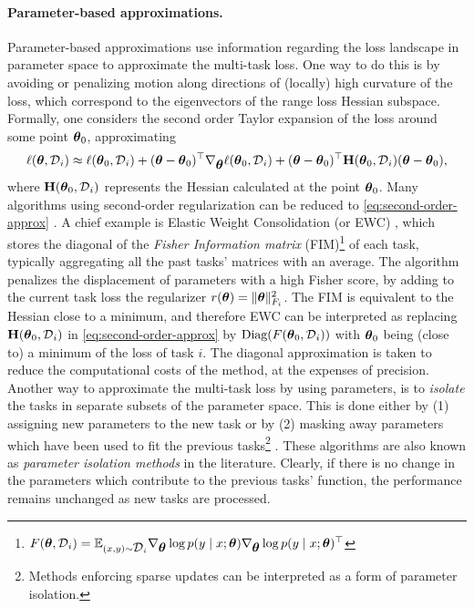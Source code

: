 \documentclass{article} %
\newcommand{\hessian}{\vH}
\begin{document}
\paragraph{Parameter-based approximations.}
Parameter-based approximations use information regarding the loss landscape in parameter space to approximate the multi-task loss. One way to do this is by avoiding or penalizing motion along directions of (locally) high curvature of the loss, which correspond to the eigenvectors of the range loss Hessian subspace. Formally, one considers the second order Taylor expansion of the loss around some point $\mbox{$\mbox{$\boldsymbol{\theta}$}$}_0$, approximating 
\begin{equation}
\label{eq:second-order-approx}
    \loss(\vparam, \data_i) \approx \loss(\vparam_0, \data_i) + (\vparam - \vparam_0)^\top\grad_{\vparam}\loss(\vparam_0, \data_i) + (\vparam - \vparam_0)^\top\hessian(\vparam_0, \data_i)(\vparam - \vparam_0),
\end{equation}
where $\hessian(\vparam_0, \data_i)$ represents the Hessian calculated at the point $\mbox{$\mbox{$\boldsymbol{\theta}$}$}_0$. Many algorithms using second-order regularization can be reduced to \cref{eq:second-order-approx} \citep{yin_optimization_2020}. A chief example is  Elastic Weight Consolidation (or EWC) \citep{kirkpatrick_overcoming_2017}, which stores the diagonal of the \emph{Fisher Information matrix} (FIM)\footnote{$F(\mbox{$\mbox{$\boldsymbol{\theta}$}$}, \mbox{${\cal D}$}_i) = \mathbb{E}_{(x, y) \sim \mbox{${\cal D}$}_i} \nabla_{\mbox{$\mbox{$\boldsymbol{\theta}$}$}} \log p(y \mid x; \mbox{$\mbox{$\boldsymbol{\theta}$}$}) 
\nabla_{\mbox{$\mbox{$\boldsymbol{\theta}$}$}} \log p(y \mid x; \mbox{$\mbox{$\boldsymbol{\theta}$}$})^\top 
$} of each task, typically aggregating all the past tasks' matrices with an average. The algorithm penalizes the displacement of parameters with a high Fisher score, by adding to the current task loss the regularizer $r(\mbox{$\mbox{$\boldsymbol{\theta}$}$}) = \|\mbox{$\mbox{$\boldsymbol{\theta}$}$}\|_{F_i}^2$. The FIM is equivalent to the Hessian close to a minimum, and therefore EWC can be interpreted as replacing $\hessian(\vparam_0, \data_i)$ in \cref{eq:second-order-approx} by $\mbox{$\mbox{Diag}$}(F(\mbox{$\mbox{$\boldsymbol{\theta}$}$}_0, \mbox{${\cal D}$}_i))$ with $\mbox{$\mbox{$\boldsymbol{\theta}$}$}_0$ being (close to) a minimum of the loss of task $i$. The diagonal approximation is taken to reduce the computational costs of the method, at the expenses of precision. Another way to approximate the multi-task loss by using parameters, is to \emph{isolate} the tasks in separate subsets of the parameter space. This is done either by (1) assigning new parameters to the new task \citep{rusu_progressive_2016,schwarz_progress_2018} or by (2) masking away parameters which have been used to fit the previous tasks\footnote{Methods enforcing sparse updates can be interpreted as a form of parameter isolation.} \citep{mallya_packnet_2018}. These algorithms are also known as \emph{parameter isolation methods} in the literature. Clearly, if there is no change in the parameters which contribute to the previous tasks' function, the performance remains unchanged as new tasks are processed. 
\end{document}
